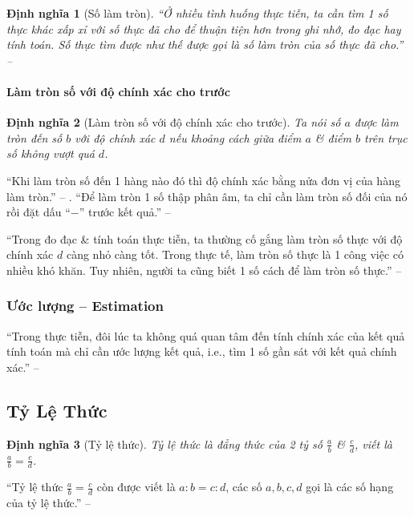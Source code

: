 \documentclass{article}
\numberwithin{equation}{section}
\newtheorem{dinhnghia}{Định nghĩa}[section]
\begin{document}
\begin{dinhnghia}[Số làm tròn]
	``Ở nhiều tình huống thực tiễn, ta cần tìm 1 số thực khác xấp xỉ với số thực đã cho để thuận tiện hơn trong ghi nhớ, đo đạc hay tính toán. Số thực tìm được như thế được gọi là \emph{số làm tròn} của số thực đã cho.'' -- \cite[p. 48]{SGK_Toan_7_Canh_Dieu_tap_1}
\end{dinhnghia}

\paragraph{Làm tròn số với độ chính xác cho trước}

\begin{dinhnghia}[Làm tròn số với độ chính xác cho trước]
	Ta nói số $a$ được làm tròn đến số $b$ với độ chính xác $d$ nếu khoảng cách giữa điểm $a$ \& điểm $b$ trên trục số không vượt quá $d$.
\end{dinhnghia}
``Khi làm tròn số đến 1 hàng nào đó thì độ chính xác bằng nửa đơn vị của hàng làm tròn.'' -- \cite[p. 49]{SGK_Toan_7_Canh_Dieu_tap_1}. ``Để làm tròn 1 số thập phân âm, ta chỉ cần làm tròn số đối của nó rồi đặt dấu ``$-$'' trước kết quả.'' -- \cite[p. 50]{SGK_Toan_7_Canh_Dieu_tap_1}

``Trong đo đạc \& tính toán thực tiễn, ta thường cố gắng làm tròn số thực với độ chính xác $d$ càng nhỏ càng tốt. Trong thực tế, làm tròn số thực là 1 công việc có nhiều khó khăn. Tuy nhiên, người ta cũng biết 1 số cách để làm tròn số thực.'' -- \cite[p. 51]{SGK_Toan_7_Canh_Dieu_tap_1}

\subsubsection{Ước lượng -- Estimation}
``Trong thực tiễn, đôi lúc ta không quá quan tâm đến tính chính xác của kết quả tính toán mà chỉ cần ước lượng kết quả, i.e., tìm 1 số gần sát với kết quả chính xác.'' -- \cite[p. 51]{SGK_Toan_7_Canh_Dieu_tap_1}

\subsection{Tỷ Lệ Thức}

\begin{dinhnghia}[Tỷ lệ thức]
	\emph{Tỷ lệ thức} là đẳng thức của 2 tỷ số $\frac{a}{b}$ \& $\frac{c}{d}$, viết là $\frac{a}{b} = \frac{c}{d}$.
\end{dinhnghia}
``Tỷ lệ thức $\frac{a}{b} = \frac{c}{d}$ còn được viết là $a:b = c:d$, các số $a,b,c,d$ gọi là các số hạng của tỷ lệ thức.'' -- \cite[p. 52]{SGK_Toan_7_Canh_Dieu_tap_1}
\end{document}
